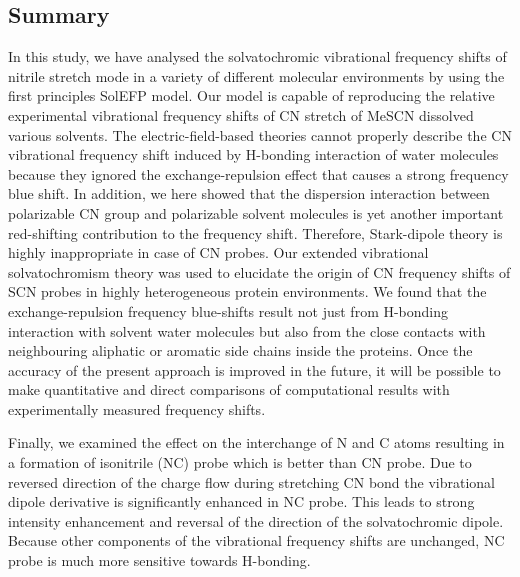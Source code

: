 \documentclass[b5paper,oneside,fleqn,11pt]{book}
\begin{document}
\begin{refsection}
\section{Summary}

In this study, we have analysed the solvatochromic vibrational
frequency shifts of nitrile stretch mode in a variety of different
molecular environments by using the first principles SolEFP
model. Our model is
capable of reproducing the relative experimental vibrational
frequency shifts of CN stretch of MeSCN dissolved various solvents. 
The
electric\hyp{}field\hyp{}based theories cannot properly describe the CN
vibrational frequency shift induced by H-bonding interaction of
water molecules because they ignored the exchange\hyp{}repulsion
effect that causes a strong frequency blue shift.
In addition, we here showed that the dispersion interaction
between polarizable CN group and polarizable solvent
molecules is yet another important red\hyp{}shifting contribution to
the frequency shift. Therefore, Stark\hyp{}dipole
theory is highly inappropriate in case of CN probes. 
Our extended vibrational solvatochromism
theory was used to elucidate the origin of CN frequency shifts
of SCN probes in highly heterogeneous protein environments. We found that 
the exchange\hyp{}repulsion frequency
blue\hyp{}shifts result not just from H-bonding interaction with
solvent water molecules but also from the close contacts with
neighbouring aliphatic or aromatic side chains inside the
proteins. Once the accuracy of the present
approach is improved in the future, it will be possible to make
quantitative and direct comparisons of computational results
with experimentally measured frequency shifts. 

Finally, we examined the effect on the interchange of N and C
atoms resulting in a formation of isonitrile (NC) probe
which is better than CN probe. Due to reversed direction
of the charge flow during stretching CN bond the vibrational
dipole derivative is significantly enhanced in NC probe.
This leads to strong intensity enhancement and reversal
of the direction of the solvatochromic dipole. Because other
components of the vibrational frequency shifts are unchanged,
NC probe is much more sensitive towards H-bonding.

\printbibliography[heading=subbibintoc,title={References}]
\end{refsection}

\end{document}
